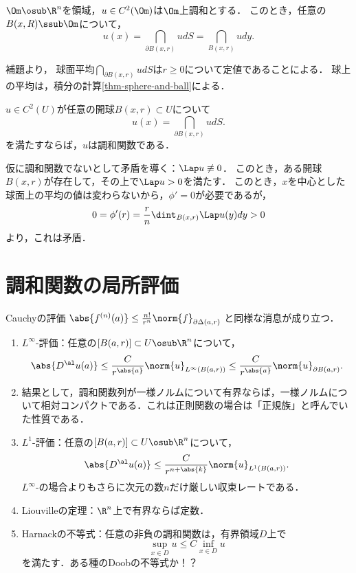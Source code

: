 \documentclass[uplatex,dvipdfmx]{jsreport}
\begin{document}
\begin{corollary}[調和関数の球面平均定理]\label{cor-surface-avarage-of-harmonic-functions}
    $\Om\osub\R^n$を領域，$u\in C^2(\Om)$は$\Om$上調和とする．
    このとき，任意の$B(x,R)\ssub\Om$について，
    \[u(x)=\dint_{\partial B(x,r)}udS=\dint_{B(x,r)}udy.\]
\end{corollary}
\begin{Proof}
    補題より，
    球面平均$\dint_{\partial B(x,r)}udS$は$r\ge0$について定値であることによる．
    球上の平均は，積分の計算\ref{thm-sphere-and-ball}による．
\end{Proof}

\begin{corollary}\label{cor-characterization-of-harmonic-function-through-mean-value-property}
    $u\in C^2(U)$が任意の開球$B(x,r)\subset U$について
    \[u(x)=\dint_{\partial B(x,r)}udS.\]
    を満たすならば，$u$は調和関数である．
\end{corollary}
\begin{Proof}
    仮に調和関数でないとして矛盾を導く：$\Lap u\not\equiv0$．
    このとき，ある開球$B(x,r)$が存在して，その上で$\Lap u>0$を満たす．
    このとき，$x$を中心とした球面上の平均の値は変わらないから，$\phi'=0$が必要であるが，
    \[0=\phi'(r)=\frac{r}{n}\dint_{B(x,r)}\Lap u(y)dy>0\]
    より，これは矛盾．
\end{Proof}

\section{調和関数の局所評価}

\begin{tcolorbox}[colframe=ForestGreen, colback=ForestGreen!10!white,breakable,colbacktitle=ForestGreen!40!white,coltitle=black,fonttitle=\bfseries\sffamily,
    title=]
    Cauchyの評価
    $\abs{f^{(n)}(a)}\le\frac{n!}{r^n}\norm{f}_{\partial\Delta(a,r)}$
    と同様な消息が成り立つ．
    \begin{enumerate}
        \item $L^\infty$-評価：任意の$[B(a,r)]\subset U\osub\R^n$について，
        \[\abs{D^\al u(a)}\le \frac{C}{r^{\abs{a}}}\norm{u}_{L^\infty(B(a,r))}\le \frac{C}{r^{\abs{a}}}\norm{u}_{\partial B(a,r)}.\]
        \item 結果として，調和関数列が一様ノルムについて有界ならば，一様ノルムについて相対コンパクトである．これは正則関数の場合は「正規族」と呼んでいた性質である．
        \item $L^1$-評価：任意の$[B(a,r)]\subset U\osub\R^n$について，
        \[\abs{D^\al u(a)}\le\frac{C}{r^{n+\abs{k}}}\norm{u}_{L^1(B(a,r))}.\]
        $L^\infty$-の場合よりもさらに次元の数$n$だけ厳しい収束レートである．
        \item Liouvilleの定理：$\R^n$上で有界ならば定数．
        \item Harnackの不等式：任意の非負の調和関数は，有界領域$D$上で
        \[\sup_{x\in D}u\le C\inf_{x\in D}u\]
        を満たす．ある種のDoobの不等式か！？
    \end{enumerate}
\end{tcolorbox}
\end{document}
